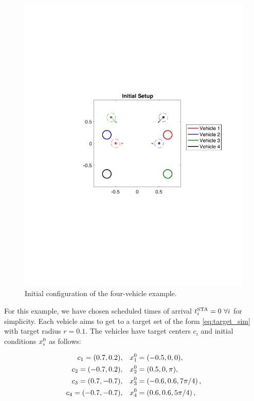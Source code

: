 \begin{figure}[H]
  \centering
  \includegraphics[width=\columnwidth]{"fig/init_setup"}
  \caption{Initial configuration of the four-vehicle example.}
  \label{fig:init_setup_dstb}
\end{figure}

For this example, we have chosen scheduled times of arrival $t^\text{STA}_i = 0~\forall i$ for simplicity. Each vehicle aims to get to a target set of the form \eqref{eq:target_sim} with target radius $r=0.1$. The vehicles have target centers $c_i$ and initial conditions $x_i^0$ as follows:

\begin{equation}
\begin{aligned}
c_1 = (0.7, 0.2), \quad& x_1^0 = (-0.5, 0, 0),\\
c_2 = (-0.7, 0.2), \quad& x_2^0 = (0.5, 0, \pi), \\
c_3 = (0.7, -0.7), \quad& x_3^0 = \left(-0.6, 0.6, 7\pi/4\right),\\
c_4 = (-0.7, -0.7), \quad & x_4^0 = \left(0.6, 0.6, 5\pi/4\right),
\end{aligned}
\end{equation}

